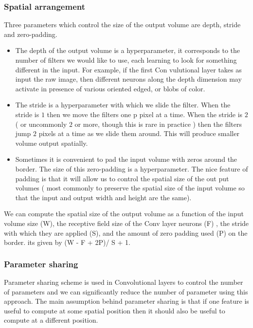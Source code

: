 \subsubsection{Spatial arrangement} Three parameters which control the size of the output volume are depth, stride and zero-padding. 
\begin{itemize}
\item The depth of the output volume is a hyperparameter, it corresponds to the number of filters we would like to use, each learning to look for something different in the input. For example, if the first Con vulutional layer takes as input the raw image, then different neurons along the depth dimension may activate in presence of various oriented edged, or blobs of color.
\item The stride is a hyperparameter with which we slide the filter. When the stride is $1$ then we move the filters one p pixel at a time. When the stride is $2$ ( or uncommonly $2$ or more, though this is rare in practice
) then the filters jump $2$ pixels at a time as we slide them around. This will produce smaller volume output spatially. 
\item Sometimes it is convenient to pad the input volume with zeros around the border. The size of this zero-padding is a hyperparameter. The nice feature of padding is that it will allow us to control the spatial size of the out put volumes ( most commonly to preserve the spatial size of the input volume so that the input and output width and height are the same).
\end{itemize}

We can compute the spatial size of the output volume as a function of the input volume size (W), the receptive field size of the Conv layer neurons (F) , the stride with which they are applied (S), and the amount of zero padding used (P) on the border. its given by (W - F + 2P)/ S + 1.

\subsubsection{Parameter sharing }
Parameter sharing scheme is used in Convolutional layers to control the number of parameters and we can significantly reduce the number of parameter using this approach. The main assumption behind parameter sharing is that if one feature is useful to compute at some spatial position then it should also be useful to compute at a different position. 
